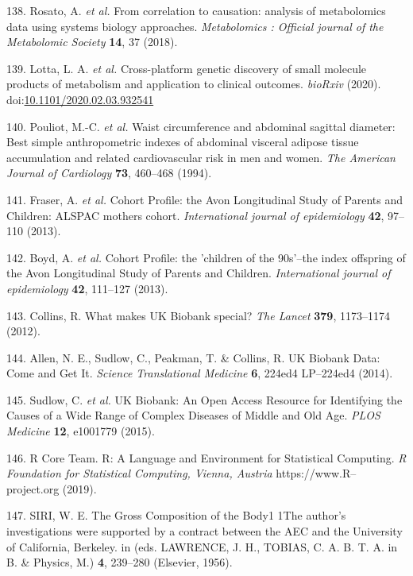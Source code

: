 \documentclass[11pt,twoside]{bristolthesis}
\begin{document}
\leavevmode\hypertarget{ref-Rosato2018}{}%
138. Rosato, A. \emph{et al.} From correlation to causation: analysis of metabolomics data using systems biology approaches. \emph{Metabolomics : Official journal of the Metabolomic Society} \textbf{14}, 37 (2018).

\leavevmode\hypertarget{ref-Lotta2020}{}%
139. Lotta, L. A. \emph{et al.} Cross-platform genetic discovery of small molecule products of metabolism and application to clinical outcomes. \emph{bioRxiv} (2020). doi:\href{https://doi.org/10.1101/2020.02.03.932541}{10.1101/2020.02.03.932541}

\leavevmode\hypertarget{ref-Pouliot1994}{}%
140. Pouliot, M.-C. \emph{et al.} Waist circumference and abdominal sagittal diameter: Best simple anthropometric indexes of abdominal visceral adipose tissue accumulation and related cardiovascular risk in men and women. \emph{The American Journal of Cardiology} \textbf{73}, 460--468 (1994).

\leavevmode\hypertarget{ref-Fraser2013}{}%
141. Fraser, A. \emph{et al.} Cohort Profile: the Avon Longitudinal Study of Parents and Children: ALSPAC mothers cohort. \emph{International journal of epidemiology} \textbf{42}, 97--110 (2013).

\leavevmode\hypertarget{ref-Boyd2013}{}%
142. Boyd, A. \emph{et al.} Cohort Profile: the 'children of the 90s'--the index offspring of the Avon Longitudinal Study of Parents and Children. \emph{International journal of epidemiology} \textbf{42}, 111--127 (2013).

\leavevmode\hypertarget{ref-Collins2012}{}%
143. Collins, R. What makes UK Biobank special? \emph{The Lancet} \textbf{379}, 1173--1174 (2012).

\leavevmode\hypertarget{ref-Allen2014}{}%
144. Allen, N. E., Sudlow, C., Peakman, T. \& Collins, R. UK Biobank Data: Come and Get It. \emph{Science Translational Medicine} \textbf{6}, 224ed4 LP--224ed4 (2014).

\leavevmode\hypertarget{ref-Sudlow2015}{}%
145. Sudlow, C. \emph{et al.} UK Biobank: An Open Access Resource for Identifying the Causes of a Wide Range of Complex Diseases of Middle and Old Age. \emph{PLOS Medicine} \textbf{12}, e1001779 (2015).

\leavevmode\hypertarget{ref-r2019}{}%
146. R Core Team. R: A Language and Environment for Statistical Computing. \emph{R Foundation for Statistical Computing, Vienna, Austria} https://www.R--project.org (2019).

\leavevmode\hypertarget{ref-SIRI1956}{}%
147. SIRI, W. E. The Gross Composition of the Body1 1The author's investigations were supported by a contract between the AEC and the University of California, Berkeley. in (eds. LAWRENCE, J. H., TOBIAS, C. A. B. T. A. in B. \& Physics, M.) \textbf{4}, 239--280 (Elsevier, 1956).
\end{document}

